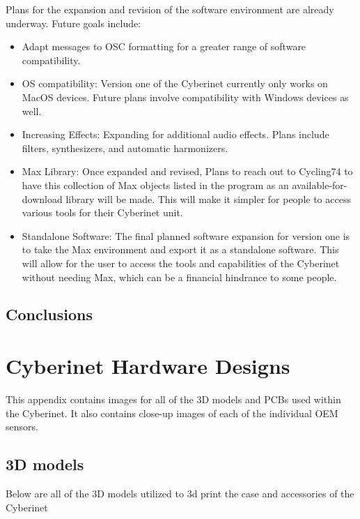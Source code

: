 Plans for the expansion and revision of the software environment are already underway. Future goals include:

\begin{itemize}
    \item Adapt messages to OSC formatting for a greater range of software compatibility.
    \item OS compatibility: Version one of  the Cyberinet currently only works on MacOS devices. Future plans involve compatibility with Windows devices as well.
    \item Increasing Effects: Expanding for additional audio effects. Plans include filters, synthesizers, and automatic harmonizers.
    \item Max Library: Once expanded and revised, Plans to reach out to Cycling74 to have this collection of Max objects listed in the program as an available-for-download library will be made. This will make it simpler for people to access various tools for their Cyberinet unit.
    \item Standalone Software: The final planned software expansion for version one is to take the Max environment and export it as a standalone software. This will allow for the user to access the tools and capabilities of the Cyberinet without needing Max, which can be a financial hindrance to some people.
\end{itemize}

\section{Conclusions}




\appendix

\chapter{Cyberinet Hardware Designs}
This appendix contains images for all of the 3D models and PCBs used within the Cyberinet. It also contains close-up images of each of the individual OEM sensors.

\section{3D models}
Below are all of the 3D models utilized to 3d print the case and accessories of the Cyberinet

